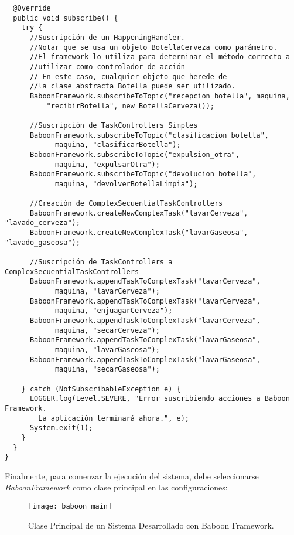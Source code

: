 \begin{verbatim}
  @Override
  public void subscribe() {
    try {
      //Suscripción de un HappeningHandler.
      //Notar que se usa un objeto BotellaCerveza como parámetro.
      //El framework lo utiliza para determinar el método correcto a
      //utilizar como controlador de acción
      // En este caso, cualquier objeto que herede de
      //la clase abstracta Botella puede ser utilizado.
      BaboonFramework.subscribeToTopic("recepcion_botella", maquina,
          "recibirBotella", new BotellaCerveza());

      //Suscripción de TaskControllers Simples
      BaboonFramework.subscribeToTopic("clasificacion_botella", 
            maquina, "clasificarBotella");
      BaboonFramework.subscribeToTopic("expulsion_otra", 
            maquina, "expulsarOtra");
      BaboonFramework.subscribeToTopic("devolucion_botella", 
            maquina, "devolverBotellaLimpia");

      //Creación de ComplexSecuentialTaskControllers
      BaboonFramework.createNewComplexTask("lavarCerveza", "lavado_cerveza");
      BaboonFramework.createNewComplexTask("lavarGaseosa", "lavado_gaseosa");

      //Suscripción de TaskControllers a ComplexSecuentialTaskControllers
      BaboonFramework.appendTaskToComplexTask("lavarCerveza", 
            maquina, "lavarCerveza");
      BaboonFramework.appendTaskToComplexTask("lavarCerveza", 
            maquina, "enjuagarCerveza");
      BaboonFramework.appendTaskToComplexTask("lavarCerveza", 
            maquina, "secarCerveza");
      BaboonFramework.appendTaskToComplexTask("lavarGaseosa", 
            maquina, "lavarGaseosa");
      BaboonFramework.appendTaskToComplexTask("lavarGaseosa",
            maquina, "secarGaseosa");

    } catch (NotSubscribableException e) {
      LOGGER.log(Level.SEVERE, "Error suscribiendo acciones a Baboon Framework.
        La aplicación terminará ahora.", e);
      System.exit(1);
    }
  }
}
\end{verbatim}

Finalmente, para comenzar la ejecución del sistema, debe seleccionarse
\emph{BaboonFramework} como clase principal en las configuraciones:

\begin{figure}[H]
    \centering
    \texttt{[image: baboon\_main]}
    \caption{Clase Principal de un Sistema Desarrollado con Baboon Framework.}
    \label{fig:baboon_main}
\end{figure}
